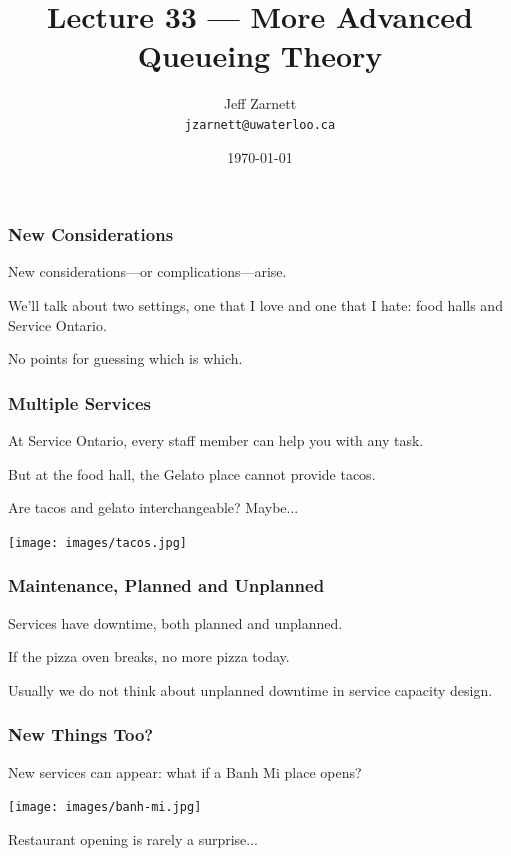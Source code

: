 

\title{Lecture 33 --- More Advanced Queueing Theory}

\author{Jeff Zarnett\\ \small \texttt{jzarnett@uwaterloo.ca}}
\date{\today}




\begin{frame}
  \titlepage

 \end{frame}


\begin{frame}
\frametitle{New Considerations}

New considerations---or complications---arise.

We'll talk about two settings, one that I love and one that I hate: food halls and Service Ontario. 
 
No points for guessing which is which.

\end{frame}


\begin{frame}
\frametitle{Multiple Services}

At Service Ontario, every staff member can help you with any task.

But at the food hall, the Gelato place cannot provide tacos.

Are tacos and gelato interchangeable? Maybe...

\begin{center}
	\texttt{[image: images/tacos.jpg]}
\end{center}

\end{frame}



\begin{frame}
\frametitle{Maintenance, Planned and Unplanned}

Services have downtime, both planned and unplanned.

If the pizza oven breaks, no more pizza today.

Usually we do not think about unplanned downtime in service capacity design.


\end{frame}


\begin{frame}
\frametitle{New Things Too?}

New services can appear: what if a Banh Mi place opens?

\begin{center}
	\texttt{[image: images/banh-mi.jpg]}
\end{center}

Restaurant opening is rarely a surprise...


\end{frame}

